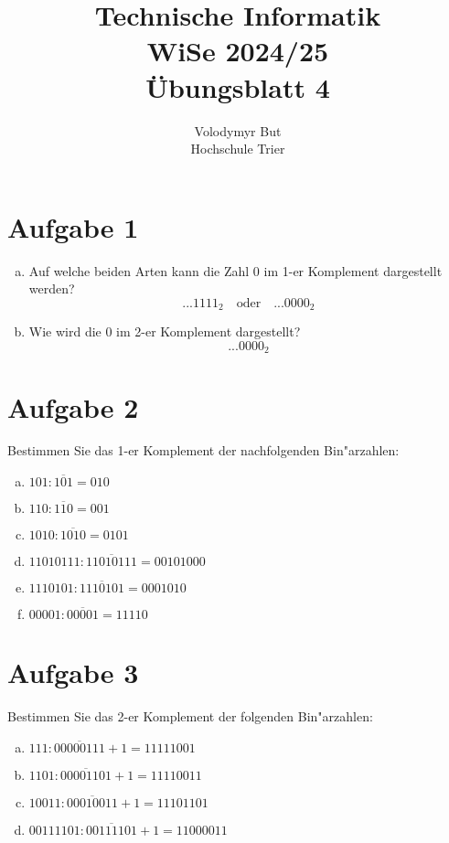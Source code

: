 \documentclass[10pt, oneside]{article}
\title{Technische Informatik\\[10pt]\Large{WiSe 2024/25}\\[15pt]\Large{{\"U}bungsblatt 4}}
\author{Volodymyr But\\[10pt]Hochschule Trier}
\date{}
\begin{document}
\sloppy

\maketitle
\vspace{25px}

\section{Aufgabe 1}

\begin{enumerate}[(a)]
    \item Auf welche beiden Arten kann die Zahl 0 im 1-er Komplement dargestellt werden?
        \begin{equation*}
            ...1111_{2} \quad\text{oder}\quad ...0000_{2}
        \end{equation*}
    \item Wie wird die 0 im 2-er Komplement dargestellt?
        \begin{equation*}
            ...0000_{2}
        \end{equation*}
\end{enumerate}

\section{Aufgabe 2}

Bestimmen Sie das 1-er Komplement der nachfolgenden Bin"arzahlen:
\begin{enumerate}[(a)]
    \item $101 : \overline{101} = 010$
    \item $110 : \overline{110} = 001$
    \item $1010 : \overline{1010} = 0101$
    \item $11010111 : \overline{11010111} = 00101000$
    \item $1110101 : \overline{1110101} = 0001010$
    \item $00001 : \overline{00001} = 11110$
\end{enumerate}

\section{Aufgabe 3}

Bestimmen Sie das 2-er Komplement der folgenden Bin"arzahlen:
\begin{enumerate}[(a)]
    \item $111 : \overline{00000111} + 1 = 11111001$
    \item $1101 : \overline{00001101} + 1 = 11110011$
    \item $10011 : \overline{00010011} + 1 = 11101101$
    \item $00111101 : \overline{00111101} + 1 = 11000011$
\end{enumerate}
\end{document}
